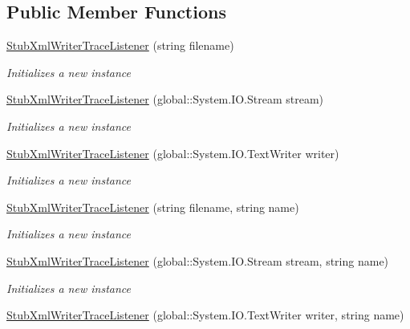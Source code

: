 \subsection*{Public Member Functions}
\begin{DoxyCompactItemize}
\item 
\hyperlink{class_system_1_1_diagnostics_1_1_fakes_1_1_stub_xml_writer_trace_listener_acb30f2dfed98ca6760e9f57e116394ee}{Stub\-Xml\-Writer\-Trace\-Listener} (string filename)
\begin{DoxyCompactList}\small\item\em Initializes a new instance\end{DoxyCompactList}\item 
\hyperlink{class_system_1_1_diagnostics_1_1_fakes_1_1_stub_xml_writer_trace_listener_a15ff67593017610dbfc4347333c75b6f}{Stub\-Xml\-Writer\-Trace\-Listener} (global\-::\-System.\-I\-O.\-Stream stream)
\begin{DoxyCompactList}\small\item\em Initializes a new instance\end{DoxyCompactList}\item 
\hyperlink{class_system_1_1_diagnostics_1_1_fakes_1_1_stub_xml_writer_trace_listener_a1f621206b816738608e6ca7d1b970536}{Stub\-Xml\-Writer\-Trace\-Listener} (global\-::\-System.\-I\-O.\-Text\-Writer writer)
\begin{DoxyCompactList}\small\item\em Initializes a new instance\end{DoxyCompactList}\item 
\hyperlink{class_system_1_1_diagnostics_1_1_fakes_1_1_stub_xml_writer_trace_listener_a20f1b5be09fe20eb82f6eedee107c581}{Stub\-Xml\-Writer\-Trace\-Listener} (string filename, string name)
\begin{DoxyCompactList}\small\item\em Initializes a new instance\end{DoxyCompactList}\item 
\hyperlink{class_system_1_1_diagnostics_1_1_fakes_1_1_stub_xml_writer_trace_listener_a4539b63f3aef528c5bd3c53e299d12dc}{Stub\-Xml\-Writer\-Trace\-Listener} (global\-::\-System.\-I\-O.\-Stream stream, string name)
\begin{DoxyCompactList}\small\item\em Initializes a new instance\end{DoxyCompactList}\item 
\hyperlink{class_system_1_1_diagnostics_1_1_fakes_1_1_stub_xml_writer_trace_listener_a461197203b283901f471c4397875942a}{Stub\-Xml\-Writer\-Trace\-Listener} (global\-::\-System.\-I\-O.\-Text\-Writer writer, string name)

\end{DoxyCompactItemize}

